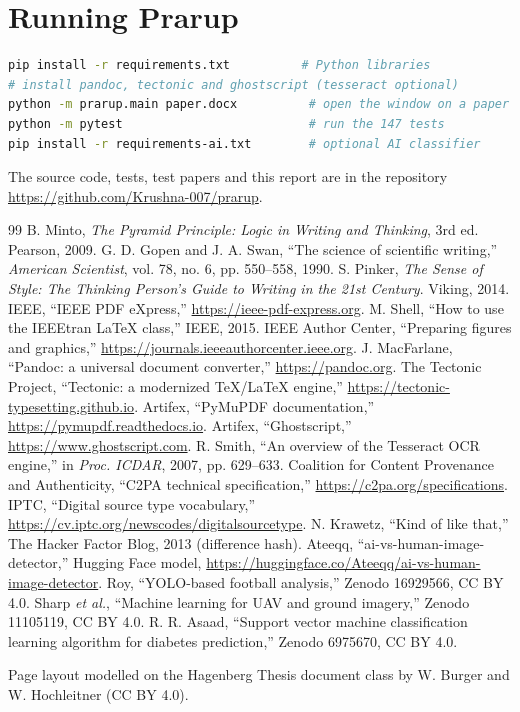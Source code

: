 \documentclass[11pt,a4paper,oneside,openany]{book}
\begin{document}
\appendix
\chapter{Running Prarup}
\begin{lstlisting}[language=bash]
pip install -r requirements.txt          # Python libraries
# install pandoc, tectonic and ghostscript (tesseract optional)
python -m prarup.main paper.docx          # open the window on a paper
python -m pytest                          # run the 147 tests
pip install -r requirements-ai.txt        # optional AI classifier
\end{lstlisting}
The source code, tests, test papers and this report are in the repository
\url{https://github.com/Krushna-007/prarup}.

\backmatter
\begin{thebibliography}{99}
\small
{} B. Minto, \emph{The Pyramid Principle: Logic in Writing and Thinking}, 3rd ed. Pearson, 2009.
 G. D. Gopen and J. A. Swan, ``The science of scientific writing,'' \emph{American Scientist}, vol. 78, no. 6, pp. 550--558, 1990.
 S. Pinker, \emph{The Sense of Style: The Thinking Person's Guide to Writing in the 21st Century}. Viking, 2014.
 IEEE, ``IEEE PDF eXpress,'' \url{https://ieee-pdf-express.org}.
 M. Shell, ``How to use the IEEEtran \LaTeX{} class,'' IEEE, 2015.
 IEEE Author Center, ``Preparing figures and graphics,'' \url{https://journals.ieeeauthorcenter.ieee.org}.
 J. MacFarlane, ``Pandoc: a universal document converter,'' \url{https://pandoc.org}.
 The Tectonic Project, ``Tectonic: a modernized \TeX/\LaTeX{} engine,'' \url{https://tectonic-typesetting.github.io}.
 Artifex, ``PyMuPDF documentation,'' \url{https://pymupdf.readthedocs.io}.
 Artifex, ``Ghostscript,'' \url{https://www.ghostscript.com}.
 R. Smith, ``An overview of the Tesseract OCR engine,'' in \emph{Proc. ICDAR}, 2007, pp. 629--633.
 Coalition for Content Provenance and Authenticity, ``C2PA technical specification,'' \url{https://c2pa.org/specifications}.
 IPTC, ``Digital source type vocabulary,'' \url{https://cv.iptc.org/newscodes/digitalsourcetype}.
 N. Krawetz, ``Kind of like that,'' The Hacker Factor Blog, 2013 (difference hash).
 Ateeqq, ``ai-vs-human-image-detector,'' Hugging Face model, \url{https://huggingface.co/Ateeqq/ai-vs-human-image-detector}.
 Roy, ``YOLO-based football analysis,'' Zenodo 16929566, CC BY 4.0.
 Sharp \emph{et al.}, ``Machine learning for UAV and ground imagery,'' Zenodo 11105119, CC BY 4.0.
 R. R. Asaad, ``Support vector machine classification learning algorithm for diabetes prediction,'' Zenodo 6975670, CC BY 4.0.
\end{thebibliography}

\noindent\footnotesize Page layout modelled on the Hagenberg Thesis document class by W. Burger and W.
Hochleitner (CC BY 4.0).
\end{document}
